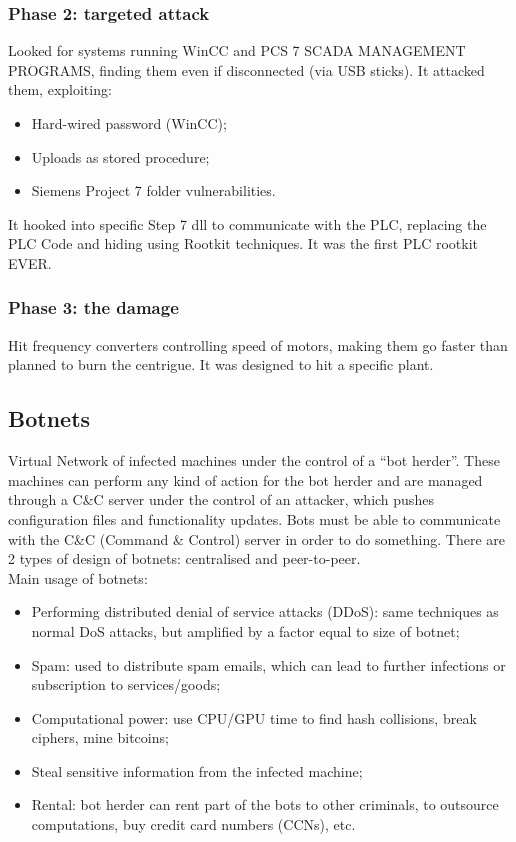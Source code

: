 \documentclass[a4paper, 10pt, titlepage]{article}
\begin{document}
\subsubsection*{Phase 2: targeted attack}
Looked for systems running WinCC and PCS 7 SCADA MANAGEMENT PROGRAMS, finding them even if disconnected (via USB sticks). It attacked them, exploiting:
\begin{itemize}
	\item Hard-wired password (WinCC);
	\item Uploads as stored procedure;
	\item Siemens Project 7 folder vulnerabilities.
\end{itemize}
It hooked into specific Step 7 dll to communicate with the PLC, replacing the PLC Code and hiding using Rootkit techniques. It was the first PLC rootkit EVER.

\subsubsection*{Phase 3: the damage}
Hit frequency converters controlling speed of motors, making them go faster than planned to burn the centrigue. It was designed to hit a specific plant.

\subsection{Botnets}
Virtual Network of infected machines under the control of a “bot herder”. These machines can perform any kind of action for the bot herder and are managed through a C\&C server under the control of an attacker, which pushes configuration files and functionality updates. Bots must be able to communicate with the C\&C (Command \& Control) server in order to do something. There are 2 types of design of botnets: centralised and peer-to-peer. \medskip\\
Main usage of botnets:
\begin{itemize}
	\item Performing distributed denial of service attacks (DDoS): same techniques as normal DoS attacks, but amplified by a factor equal to size of botnet;
	\item Spam: used to distribute spam emails, which can lead to further infections or subscription to services/goods;
	\item Computational power: use CPU/GPU time to find hash collisions, break ciphers, mine bitcoins;
	\item Steal sensitive information from the infected machine;
	\item Rental: bot herder can rent part of the bots to other 	criminals, to outsource computations, buy credit card numbers (CCNs), etc.
\end{itemize}
\end{document}
